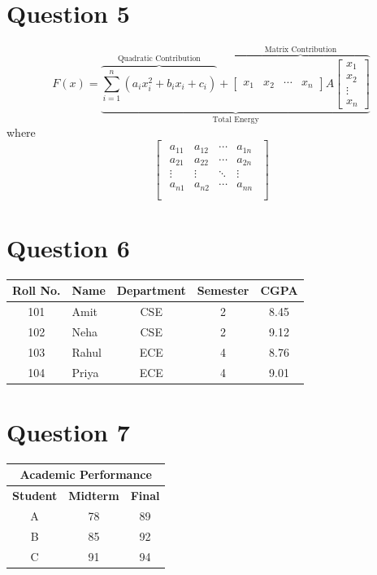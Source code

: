 \documentclass{article}
\begin{document}
\section{Question 5}
\[
F(x)=
\underbrace{
\overbrace{
\sum_{i=1}^{n}
\left(a_i x_i^2+b_i x_i+c_i\right)
}^{\text{Quadratic Contribution}}
+
\overbrace{
\begin{bmatrix}
x_1 & x_2 & \cdots & x_n
\end{bmatrix}
A
\begin{bmatrix}
x_1\\
x_2\\
\vdots\\
x_n
\end{bmatrix}
}^{\text{Matrix Contribution}}
}_{\text{Total Energy}}
\]
where
\[
\begin{bmatrix}
\begin{matrix}
a_{11} & a_{12} & \cdots & a_{1n} \\
a_{21} & a_{22} & \cdots & a_{2n} \\
\vdots & \vdots & \ddots & \vdots \\
a_{n1} & a_{n2} & \cdots & a_{nn} \\
\end{matrix}
\end{bmatrix}
\]

\section{Question 6}
\begin{tabular}{|c|l|c|c|c|}
\hline
\textbf{Roll No.} & \textbf{Name} & \textbf{Department} & \textbf{Semester} & \textbf{CGPA} \\
\hline
101 & Amit  & CSE & 2 & 8.45 \\
\hline
102 & Neha  & CSE & 2 & 9.12 \\
\hline
103 & Rahul & ECE & 4 & 8.76 \\
\hline
104 & Priya & ECE & 4 & 9.01 \\
\hline
\end{tabular}

\section{Question 7}
\centering
\begin{tabular}{|c|c|c|}
\hline
\multicolumn{3}{|c|}{\textbf{Academic Performance}} \\
\hline
\textbf{Student} & \textbf{Midterm} & \textbf{Final} \\
\hline
A & 78 & 89 \\
\hline
B & 85 & 92 \\
\hline
C & 91 & 94 \\
\hline
\end{tabular}
\end{document}

